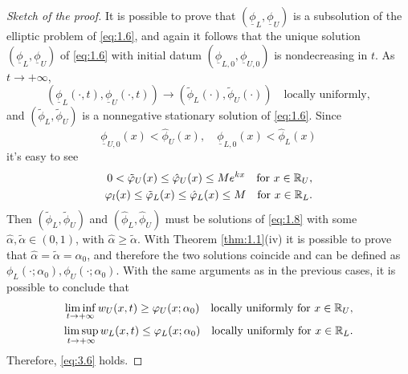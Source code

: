 \begin{proof}[Sketch of the proof]
    It is possible to prove that \((\underline{\phi}_L, \underline{\phi}_U)\) is a subsolution of the elliptic problem of \eqref{eq:1.6}, and again it follows that the unique solution \((\underline{\phi}_L, \underline{\phi}_U)\) of \eqref{eq:1.6} with initial datum \((\underline{\phi}_{L,0}, \underline{\phi}_{U,0})\) is nondecreasing in \(t\). As \(t \to +\infty\),
    \[
        (\underline{\phi}_L(\cdot, t), \underline{\phi}_U(\cdot, t)) \to (\tilde{\phi}_L(\cdot), \tilde{\phi}_U(\cdot)) \quad \text{locally uniformly},
    \]
    and \((\tilde{\phi}_L, \tilde{\phi}_U)\) is a nonnegative stationary solution of \eqref{eq:1.6}. Since
    \[
        \underline{\phi}_{U,0}(x) < \hat{\phi}_U(x), \quad \underline{\phi}_{L,0}(x) < \hat{\phi}_L(x)
    \]
    it's easy to see
    \begin{align*}
        0 < \tilde{\varphi}_U(x) \leq \hat{\varphi}_U(x)  \leq M e^{kx} \quad \text{for } x \in \mathbb{R}_U, \\
        \varphi_l(x) \leq \tilde{\varphi}_L(x) \leq \hat{\varphi}_L(x) \leq M \quad \text{for } x \in \mathbb{R}_L.
    \end{align*}
    Then \((\tilde{\phi}_L, \tilde{\phi}_U)\) and \((\hat{\phi}_L, \hat{\phi}_U)\) must be solutions of \eqref{eq:1.8} with some \(\hat{\alpha}, \tilde{\alpha} \in (0,1)\), with \(\hat{\alpha} \geq \tilde{\alpha}\). With Theorem \ref{thm:1.1}(iv) it is possible to prove that \(\hat{\alpha} = \tilde{\alpha} = \alpha_0\), and therefore the two solutions coincide and can be defined as \(\phi_L(\cdot; \alpha_0), \phi_U(\cdot; \alpha_0)\).
    With the same arguments as in the previous cases, it is possible to conclude that
    \begin{align*}
        \liminf_{t \to +\infty} w_U(x, t) \geq \varphi_U(x; \alpha_0) \quad \text{locally uniformly for } x \in \mathbb{R}_U, \\
        \limsup_{t \to +\infty} w_L(x, t) \leq \varphi_L(x; \alpha_0) \quad \text{locally uniformly for } x \in \mathbb{R}_L.
    \end{align*}
    Therefore, \eqref{eq:3.6} holds.
\end{proof}